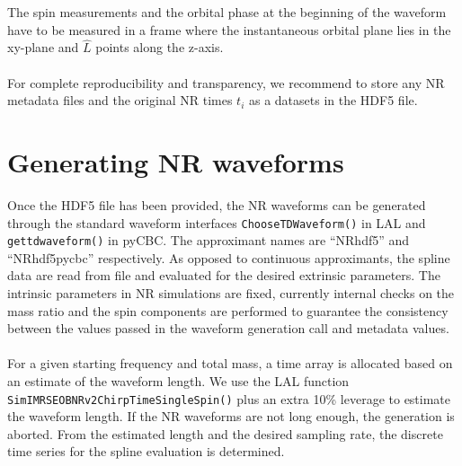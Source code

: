 \documentclass[aps,prd,amssymb,amsmath,amsfonts,superscriptaddress,
floatfix ,preprintnumbers,altaffilletter]{revtex4}
\begin{document}
The spin measurements and the orbital phase at the beginning of the waveform have to be measured in a frame where the instantaneous orbital plane
lies in the xy-plane and $\hat{L}$ points along the z-axis. \\
\\ For complete reproducibility and transparency, we recommend to store any NR metadata files and the original NR times $t_i$ as a datasets in the HDF5 file.

\section{Generating NR waveforms}
\label{sec:gen}
Once the HDF5 file has been provided, the NR waveforms can be generated through the standard waveform interfaces \texttt{ChooseTDWaveform()} in LAL
and \texttt{get\textunderscore td\textunderscore waveform()} in pyCBC. The approximant names are ``NR\textunderscore hdf5'' and ``NR\textunderscore hdf5\textunderscore pycbc'' respectively. 
As opposed to continuous approximants, the spline data are read from file and evaluated for the desired extrinsic
parameters. The intrinsic parameters in NR simulations are fixed, currently internal checks on the mass ratio and the spin components 
are performed to guarantee the consistency between the values passed
in the waveform generation call and metadata values. \\
\\For a given starting frequency and total mass, a time array is allocated based on an estimate of the waveform length. We use the LAL function 
\texttt{SimIMRSEOBNRv2ChirpTimeSingleSpin()} plus an extra 10\% leverage to estimate the waveform length. If the NR waveforms are not long
enough, the generation is aborted. From the estimated length and the desired sampling rate, the discrete time series for the spline evaluation is
determined.
\end{document}
